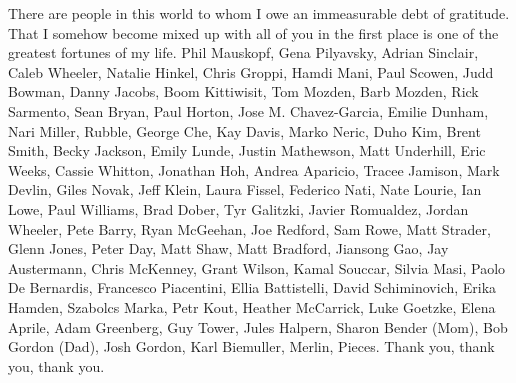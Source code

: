 There are people in this world to whom I owe an immeasurable debt of gratitude. That I somehow become mixed up with all of you in the first place is one of the greatest fortunes of my life.
\newline\newline
Phil Mauskopf, Gena Pilyavsky, Adrian Sinclair, Caleb Wheeler, Natalie Hinkel, Chris Groppi, Hamdi Mani, Paul Scowen, Judd Bowman, Danny Jacobs, Boom Kittiwisit, Tom Mozden, Barb Mozden, Rick Sarmento, Sean Bryan, Paul Horton, Jose M. Chavez-Garcia, Emilie Dunham, Nari Miller, Rubble, George Che, Kay Davis, Marko Neric, Duho Kim, Brent Smith, Becky Jackson, Emily Lunde, Justin Mathewson, Matt Underhill, Eric Weeks, Cassie Whitton, Jonathan Hoh, Andrea Aparicio, Tracee Jamison, Mark Devlin, Giles Novak, Jeff Klein, Laura Fissel, Federico Nati, Nate Lourie, Ian Lowe, Paul Williams, Brad Dober, Tyr Galitzki, Javier Romualdez, Jordan Wheeler, Pete Barry, Ryan McGeehan, Joe Redford, Sam Rowe, Matt Strader, Glenn Jones, Peter Day, Matt Shaw, Matt Bradford, Jiansong Gao, Jay Austermann, Chris McKenney, Grant Wilson, Kamal Souccar, Silvia Masi, Paolo De Bernardis, Francesco Piacentini, Ellia Battistelli, David Schiminovich, Erika Hamden, Szabolcs Marka, Petr Kout, Heather McCarrick, Luke Goetzke, Elena Aprile, Adam Greenberg, Guy Tower, Jules Halpern, Sharon Bender (Mom), Bob Gordon (Dad), Josh Gordon, Karl Biemuller, Merlin, Pieces.
\newline\newline
Thank you, thank you, thank you.
